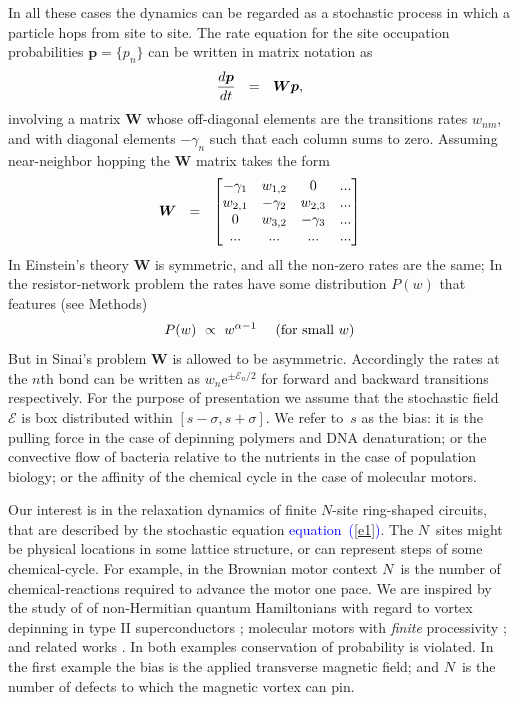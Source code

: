 \documentclass[aps,pre,floats,floatfix,twocolumn]{revtex4}
\newcommand{\amatrix}[1]{\begin{matrix} #1 \end{matrix}}
\newcommand{\eexp}[1]{\mathrm{e}^{#1}}
\newcommand{\be}[1]{\begin{eqnarray}\ifthenelse{#1=-1}{\nonumber}{\ifthenelse{#1=0}{}{\label{e#1}}}}
\newcommand{\eeq}{\end{eqnarray}}
\newcommand{\Eq}[1]{\textcolor{blue}{{equation}\!~(\ref{#1})}}
\begin{document}
%
In all these cases the dynamics can be regarded as a stochastic process 
in which a particle hops from site to site.
The rate equation for the site occupation probabilities $\bm{p}  = \{p_n\}$
can be written in matrix notation as 
%
\be{1}
\frac{d\bm{p}}{dt} \ \ = \ \ \bm{W} \bm{p}, 
\eeq
%
involving a matrix ${\bm{W}}$ whose off-diagonal elements 
are the transitions rates ${w_{nm}}$, 
and with diagonal elements ${-\gamma_n}$ such that each column sums to zero.
Assuming near-neighbor hopping the ${\bm{W}}$ matrix takes the form
%
\be{2}
\bm{W} \ \ = \ \ \left[\amatrix{
-\gamma_1   & w_{1,2}   & 0         & ... \\ 
w_{2,1}     & -\gamma_2 & w_{2,3}   & ... \\ 
0           & w_{3,2}   & -\gamma_3 & ... \\
...         & ...       & ...       & ...
}\right]
\eeq 
%
In Einstein's theory $\bm{W}$ is symmetric, 
and all the non-zero rates are the same; 
In the resistor-network problem the rates
have some distribution $P(w)$ that features (see Methods)
%
\be{4}
P(w) \ \propto \ w^{\alpha-1} \ \ \ \ \text{(for small $w$)}
\eeq
%
But in Sinai's problem $\bm{W}$ is allowed to be asymmetric.
Accordingly the rates at the $n$th bond can be written 
as $w_n\eexp{\pm\mathcal{E}_n/2}$ 
for forward  and backward transitions respectively. 
For the purpose of presentation we assume that the stochastic field~$\mathcal{E}$  
is box distributed within ${[s-\sigma,s+\sigma]}$.
We refer to~$s$ as the bias:  
it is the pulling force in the case of depinning polymers and DNA denaturation; 
or the convective flow of bacteria relative to the nutrients in the case of population biology; 
or the affinity of the chemical cycle in the case of molecular motors.

Our interest is in the relaxation dynamics 
of finite $N$-site ring-shaped circuits, 
that are described by the stochastic equation \Eq{e1}.
The $N$~sites might be physical locations in some lattice 
structure, or can represent steps of some chemical-cycle. 
For example, in the Brownian motor context $N$~is the number 
of chemical-reactions required to advance the motor one pace. 
%
We are inspired by the study of of non-Hermitian quantum Hamiltonians 
with regard to vortex depinning in type II superconductors \cite{Hatano1,Hatano2,Shnerb1};   
molecular motors with {\em finite} processivity \cite{brm1,brm2}; 
and related works \cite{Brouwer,Goldsheid,Zee}.
In both examples conservation of probability is violated.  
In the first example the bias is the applied transverse magnetic field;  
and $N$~is the number of defects to which the magnetic vortex can pin.
\end{document}
